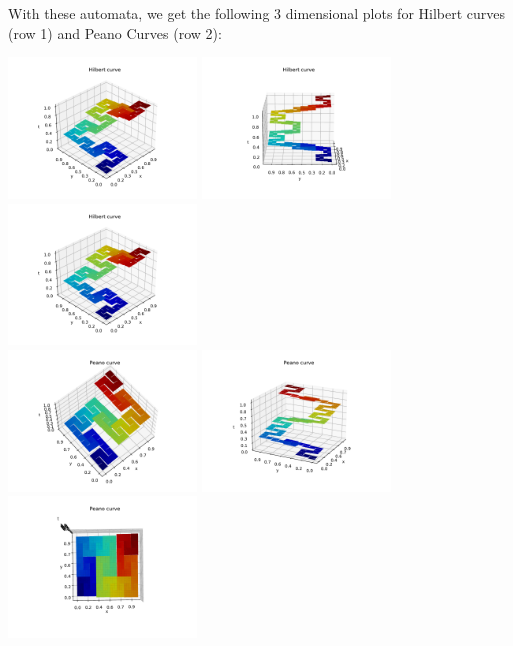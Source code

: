 \documentclass[10pt,usenames,dvipsnames]{article}
\begin{document}
With these automata, we get the following 3 dimensional plots for Hilbert curves (row 1) and Peano Curves (row 2):

\begin{center}
    \includegraphics[width=5cm]{FA20/images/fractals/hilbert-1.pdf}
    \includegraphics[width=5cm]{FA20/images/fractals/hilbert-2.pdf}
    \includegraphics[width=5cm]{FA20/images/fractals/hilbert-1.pdf}\\
    \includegraphics[width=5cm]{FA20/images/fractals/peano-1.pdf}
    \includegraphics[width=5cm]{FA20/images/fractals/peano-2.pdf}
    \includegraphics[width=5cm]{FA20/images/fractals/peano-3.pdf}\\
\end{center}
\end{document}
